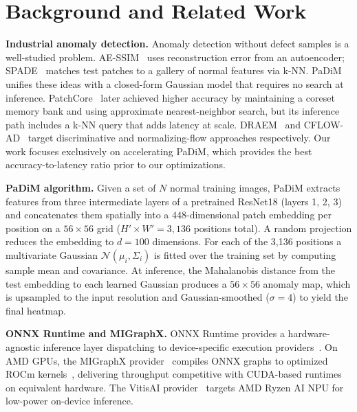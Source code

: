 \documentclass[blind]{gtac}
\begin{document}
\section{Background and Related Work}
\label{sec:background}

\textbf{Industrial anomaly detection.}
Anomaly detection without defect samples is a well-studied problem.
AE-SSIM~\cite{bergmann2019improving} uses reconstruction error from an
autoencoder; SPADE~\cite{cohen2020sub} matches test patches to a gallery of
normal features via k-NN.  PaDiM~\cite{defard2021padim} unifies these ideas
with a closed-form Gaussian model that requires no search at inference.
PatchCore~\cite{roth2022towards} later achieved higher accuracy by maintaining
a coreset memory bank and using approximate nearest-neighbor search, but its
inference path includes a k-NN query that adds latency at scale.
DRAEM~\cite{zavrtanik2021reconstruction} and
CFLOW-AD~\cite{gudovskiy2022cflow} target discriminative and normalizing-flow
approaches respectively.  Our work focuses exclusively on accelerating PaDiM,
which provides the best accuracy-to-latency ratio prior to our optimizations.

\textbf{PaDiM algorithm.}
Given a set of $N$ normal training images, PaDiM extracts features from three
intermediate layers of a pretrained ResNet18 (layers 1, 2, 3) and concatenates
them spatially into a $448$-dimensional patch embedding per position on a
$56\!\times\!56$ grid ($H'\!\times\!W'\!=\!3{,}136$ positions total).  A
random projection reduces the embedding to $d\!=\!100$ dimensions.  For each of
the 3{,}136 positions a multivariate Gaussian $\mathcal{N}(\mu_i, \Sigma_i)$
is fitted over the training set by computing sample mean and covariance.  At
inference, the Mahalanobis distance from the test embedding to each learned
Gaussian produces a $56\!\times\!56$ anomaly map, which is upsampled to the
input resolution and Gaussian-smoothed ($\sigma\!=\!4$) to yield the final heatmap.

\textbf{ONNX Runtime and MIGraphX.}
ONNX Runtime provides a hardware-agnostic inference layer dispatching to
device-specific execution providers~\cite{onnxruntime}.  On AMD GPUs, the
MIGraphX provider~\cite{migraphx} compiles ONNX graphs to optimized ROCm
kernels~\cite{rocm}, delivering throughput competitive with CUDA-based runtimes
on equivalent hardware.  The VitisAI provider~\cite{vitisai} targets AMD Ryzen
AI NPU for low-power on-device inference.
\end{document}
